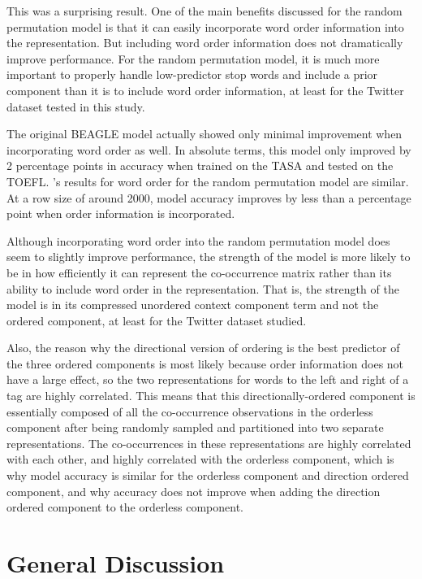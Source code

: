 \documentclass[man,floatsintext,donotrepeattitle]{apa6}
\begin{document}
This was a surprising result.
One of the main benefits discussed for the random permutation model is that it can easily incorporate word order information into the representation.
But including word order information does not dramatically improve performance. 
For the random permutation model, it is much more important to properly handle low-predictor stop words and include a prior component than it is to include word order information,
at least for the Twitter dataset tested in this study.

The original BEAGLE model \parencite{Jones2007} actually showed only minimal improvement when incorporating word order as well.
In absolute terms, this model only improved by 2 percentage points in accuracy when trained on the TASA and tested on the TOEFL.
\textcite{Sahlgren2008}'s results for word order for the random permutation model are similar.
At a row size of around \num{2000}, model accuracy improves by less than a percentage point when order information is incorporated.

Although incorporating word order into the random permutation model does seem to slightly improve performance,
the strength of the model is more likely to be in how efficiently it can represent the co-occurrence matrix rather than its ability to include word order in the representation.
That is, the strength of the model is in its compressed unordered context component term and not the ordered component, at least for the Twitter dataset studied.

Also, the reason why the directional version of ordering is the best predictor of the three ordered components is most likely because order information does not have a large effect,
so the two representations for words to the left and right of a tag are highly correlated.
This means that this directionally-ordered component is essentially composed of all the co-occurrence observations in the orderless component after being randomly sampled and partitioned into two separate representations.
The co-occurrences in these representations are highly correlated with each other, and highly correlated with the orderless component,
which is why model accuracy is similar for the orderless component and direction ordered component, and why accuracy does not improve when adding the direction ordered component to the orderless component.

\section{General Discussion}
\end{document}
